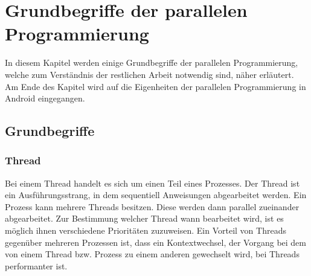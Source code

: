 \chapter [Grundbegriffe der parallelen Programmierung] {Grundbegriffe der parallelen Programmierung}
\label{chap:paralleleProgrammierung}

In diesem Kapitel werden einige Grundbegriffe der parallelen Programmierung, welche zum Verständnis der restlichen Arbeit notwendig sind, näher erläutert. Am Ende des Kapitel wird auf die Eigenheiten der parallelen Programmierung in Android eingegangen.

\section{Grundbegriffe}
\subsection{Thread}
Bei einem Thread handelt es sich um einen Teil eines Prozesses. Der Thread ist ein Ausführungsstrang, in dem sequentiell Anweisungen abgearbeitet werden. Ein Prozess kann mehrere Threads besitzen. Diese werden dann parallel zueinander abgearbeitet. Zur Bestimmung welcher Thread wann bearbeitet wird, ist es möglich ihnen verschiedene Prioritäten zuzuweisen. Ein Vorteil von Threads gegenüber mehreren Prozessen ist, dass ein Kontextwechsel, der Vorgang bei dem von einem Thread bzw. Prozess zu einem anderen gewechselt wird, bei Threads performanter ist.

